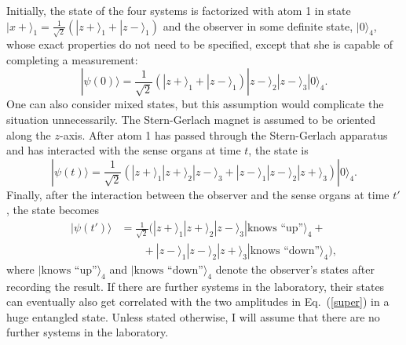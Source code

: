 \documentclass[12pt,a4]{article}
\begin{document}
Initially, the state of the four systems is factorized with atom 1 in state $|x+\rangle_1 = \frac{1}{\sqrt{2}} (|z+\rangle_1 + |z-\rangle_1)$ and the observer in some definite state, $|0\rangle_4$, whose exact properties do not need to be specified, except that she is capable of completing a measurement:
\begin{equation}
|\psi(0)\rangle = \frac{1}{\sqrt{2}} (|z+\rangle_1+|z-\rangle_1)|z-\rangle_2|z-\rangle_3|0\rangle_4.
\end{equation}
One can also consider mixed states, but this assumption would complicate the situation unnecessarily. The Stern-Gerlach magnet is assumed to be oriented along the $z$-axis. After atom 1 has passed through the Stern-Gerlach apparatus and has interacted with the sense organs at time $t$, the state is 
\begin{equation}
|\psi(t)\rangle = \frac{1}{\sqrt{2}} (|z+\rangle_1|z+\rangle_2|z-\rangle_3 +|z-\rangle_1|z-\rangle_2|z+\rangle_3 )|0\rangle_4.
\end{equation}
Finally, after the interaction between the observer and the sense organs at time $t'$, the state becomes
\begin{equation}
\begin{aligned}
|\psi(t')\rangle &= \frac{1}{\sqrt{2}} (|z+\rangle_1|z+ \rangle_2|z-\rangle_3|\mbox{knows ``up''}\rangle_4 + \\ 
& \qquad + |z-\rangle_1|z-\rangle_2|z+\rangle_3 |\mbox{knows ``down''}\rangle_4),\label{super}
\end{aligned}
\end{equation}
where $|\mbox{knows ``up''}\rangle_4$ and $|\mbox{knows ``down''}\rangle_4$ denote the observer's states after recording the result. If there are further systems in the laboratory, their states can eventually also get correlated with the two amplitudes in Eq.~(\ref{super}) in a huge entangled state. Unless stated otherwise, I will assume that there are no further systems in the laboratory. 
\end{document}
